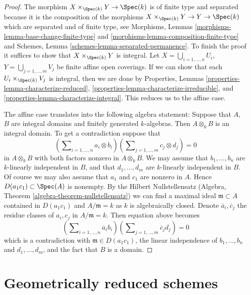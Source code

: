 \begin{proof}
The morphism $X \times_{\Spec(k)} Y \to \Spec(k)$ is of
finite type and separated because it is the composition of the
morphisms $X \times_{\Spec(k)} Y \to Y \to \Spec(k)$
which are separated and of finite type, see
Morphisms, Lemmas \ref{morphisms-lemma-base-change-finite-type} and
\ref{morphisms-lemma-composition-finite-type}
and
Schemes, Lemma \ref{schemes-lemma-separated-permanence}.
To finish the proof it suffices to show that $X \times_{\Spec(k)} Y$
is integral.
Let $X = \bigcup_{i = 1, \ldots, n} U_i$,
$Y = \bigcup_{j = 1, \ldots, m} V_j$ be finite affine open coverings.
If we can show that each $U_i \times_{\Spec(k)} V_j$ is integral,
then we are done by
Properties, Lemmas \ref{properties-lemma-characterize-reduced},
\ref{properties-lemma-characterize-irreducible}, and
\ref{properties-lemma-characterize-integral}.
This reduces us to the affine case.

\medskip\noindent
The affine case translates into the following algebra statement: Suppose
that $A$, $B$ are integral domains and finitely generated $k$-algebras.
Then $A \otimes_k B$ is an integral domain. To get a contradiction suppose that
$$
(\sum\nolimits_{i = 1, \ldots, n} a_i \otimes b_i)
(\sum\nolimits_{j = 1, \ldots, m} c_j \otimes d_j) = 0
$$
in $A \otimes_k B$ with both factors nonzero in $A \otimes_k B$.
We may assume that $b_1, \ldots, b_n$ are $k$-linearly
independent in $B$, and that $d_1, \ldots, d_m$ are $k$-linearly independent
in $B$. Of course we may also assume that $a_1$ and $c_1$ are nonzero
in $A$. Hence $D(a_1c_1) \subset \Spec(A)$ is nonempty. By the
Hilbert Nullstellensatz
(Algebra, Theorem \ref{algebra-theorem-nullstellensatz})
we can find a maximal ideal $\mathfrak m \subset A$ contained in
$D(a_1c_1)$ and $A/\mathfrak m = k$ as $k$ is algebraically closed.
Denote $\overline{a}_i, \overline{c}_j$ the residue classes of
$a_i, c_j$ in $A/\mathfrak m = k$. Then equation above becomes
$$
(\sum\nolimits_{i = 1, \ldots, n} \overline{a}_i b_i)
(\sum\nolimits_{j = 1, \ldots, m} \overline{c}_j d_j) = 0
$$
which is a contradiction with
$\mathfrak m \in D(a_1c_1)$, the linear independence of
$b_1, \ldots, b_n$ and $d_1, \ldots, d_m$, and the fact that $B$ is a domain.
\end{proof}






\section{Geometrically reduced schemes}
\label{section-geometrically-reduced}

